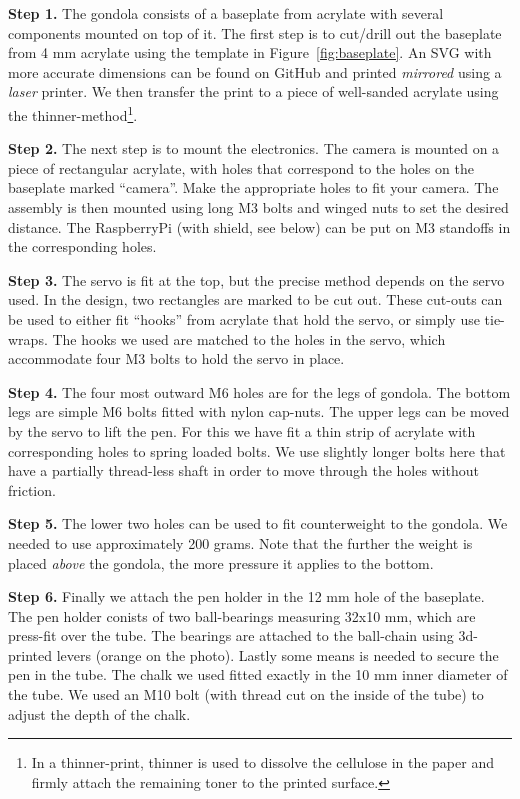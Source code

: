 \documentclass[a4paper,10pt]{article}
\begin{document}
\textbf{Step 1.} The gondola consists of a baseplate from acrylate with several components mounted on top of it.
The first step is to cut/drill out the baseplate from 4 mm acrylate using the template in Figure~\ref{fig:baseplate}. An SVG with more accurate dimensions can be found on GitHub\cite{github} and printed \emph{mirrored} using a \emph{laser} printer. We then transfer the print to a piece of well-sanded acrylate using the thinner-method\footnote{In a thinner-print, thinner is used to dissolve the cellulose in the paper and firmly attach the remaining toner to the printed surface.}.

\textbf{Step 2.} The next step is to mount the electronics. The camera is mounted on a piece of rectangular acrylate, with holes that correspond to the holes on the baseplate marked ``camera''. Make the appropriate holes to fit your camera. The assembly is then mounted using long M3 bolts and winged nuts to set the desired distance. The RaspberryPi (with shield, see below) can be put on M3 standoffs in the corresponding holes.

\textbf{Step 3.} The servo is fit at the top, but the precise method depends on the servo used. In the design, two rectangles are marked to be cut out. These cut-outs can be used to either fit ``hooks'' from acrylate that hold the servo, or simply use tie-wraps. The hooks we used are matched to the holes in the servo, which accommodate four M3 bolts to hold the servo in place.

\textbf{Step 4.} The four most outward M6 holes are for the legs of gondola. The bottom legs are simple M6 bolts fitted with nylon cap-nuts. The upper legs can be moved by the servo to lift the pen. For this we have fit a thin strip of acrylate with corresponding holes to spring loaded bolts. We use slightly longer bolts here that have a partially thread-less shaft in order to move through the holes without friction.

\textbf{Step 5.} The lower two holes can be used to fit counterweight to the gondola. We needed to use approximately 200 grams. Note that the further the weight is placed \emph{above} the gondola, the more pressure it applies to the bottom.

\textbf{Step 6.} Finally we attach the pen holder in the 12 mm hole of the baseplate. The pen holder conists of two ball-bearings measuring 32x10 mm, which are press-fit over the tube. The bearings are attached to the ball-chain using 3d-printed levers (orange on the photo). Lastly some means is needed to secure the pen in the tube. The chalk we used fitted exactly in the 10 mm inner diameter of the tube. We used an M10 bolt (with thread cut on the inside of the tube) to adjust the depth of the chalk.
\end{document}
